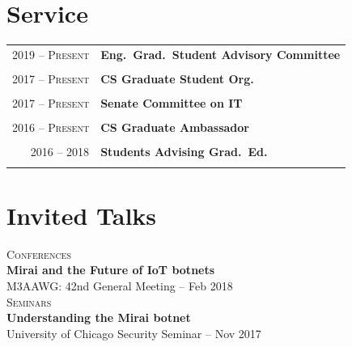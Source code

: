 \documentclass[10pt]{article} %
\begin{document}
{\begin{minipage}[t]{0.44\textwidth}
\section{Service} 

\begin{tabular}{rl}
2019 -- \textsc{Present} & \textbf{Eng.\ Grad.\ Student Advisory Committee}\\
& \\

2017 -- \textsc{Present} & \textbf{CS Graduate Student Org.}\\
& \\

2017 -- \textsc{Present} & \textbf{Senate Committee on IT} \\
& \\

2016 -- \textsc{Present} & \textbf{CS Graduate Ambassador}\\
& \\

2016 -- 2018 & \textbf{Students Advising Grad.\ Ed.}\\
& \\


\end{tabular}


\section{Invited Talks} 

\textsc{Conferences}\\
\hspace*{15pt} \textbf{Mirai and the Future of IoT botnets}\\
\hspace*{15pt} M3AAWG: 42nd General Meeting -- Feb 2018 \\

\textsc{Seminars}\\
\hspace*{15pt} \textbf{Understanding the Mirai botnet} \\
\hspace*{15pt} University of Chicago Security Seminar -- Nov 2017 \\



\end{minipage}}
\end{document}
